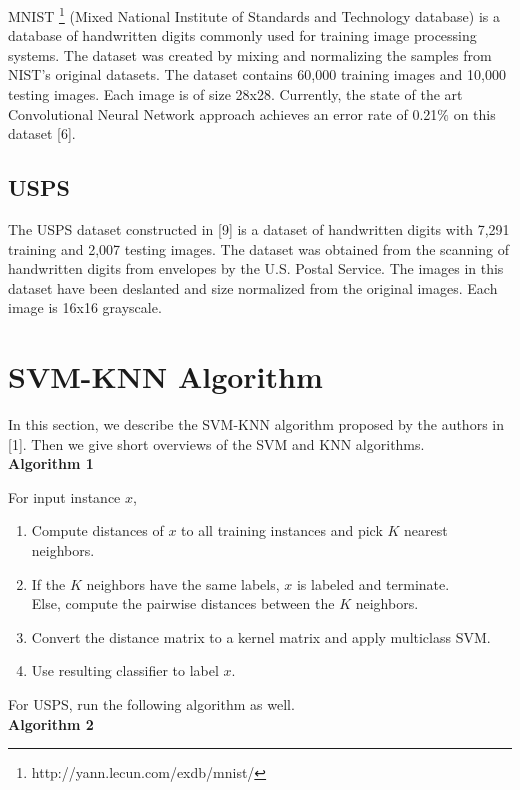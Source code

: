 \documentclass[11pt,letterpaper]{article}
\begin{document}
MNIST \footnote{http://yann.lecun.com/exdb/mnist/} (Mixed National Institute of Standards and Technology database) is a database of handwritten digits commonly used for training image processing systems. The dataset was created by mixing and normalizing the samples from NIST's original datasets. The dataset contains 60,000 training images and 10,000 testing images. Each image is of size 28x28. Currently, the state of the art Convolutional Neural Network approach achieves an error rate of 0.21$\%$ on this dataset [6].

\subsection{USPS}

The USPS dataset constructed in [9] is a dataset of handwritten digits with 7,291 training and 2,007 testing images. The dataset was obtained from the scanning of handwritten digits from envelopes by the U.S. Postal Service. The images in this dataset have been deslanted and size normalized from the original images. Each image is 16x16 grayscale.

\section{SVM-KNN Algorithm}

In this section, we describe the SVM-KNN algorithm proposed by the authors in [1]. Then we give short overviews of the SVM and KNN algorithms.\\

\textbf{Algorithm 1}

For input instance $x$,
\begin{enumerate}[(1)]
\item Compute distances of $x$ to all training instances and pick $K$ nearest neighbors.
\item If the $K$ neighbors have the same labels, $x$ is labeled and terminate.\\
\qquad Else, compute the pairwise distances between the $K$ neighbors.
\item Convert the distance matrix to a kernel matrix and apply multiclass SVM.
\item Use resulting classifier to label $x$.
\end{enumerate}

For USPS, run the following algorithm as well.\\

\textbf{Algorithm 2}
\end{document}
